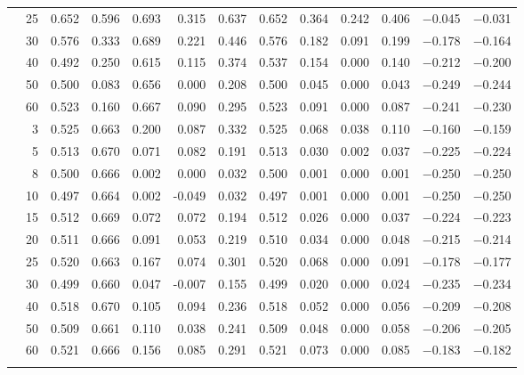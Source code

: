 \documentclass[conference]{IEEEtran}
\theoremstyle{remark}
\begin{document}
\begin{table}[ht]
{\begin{tabular}{p{2.2cm}r rrrr rr rr r rr}
  & 25 & 0.652 & 0.596 & 0.693 & 0.315 & 0.637 & 0.652 & 0.364 & 0.242 & 0.406 & $-$0.045 & $-$0.031 \\
  & 30 & 0.576 & 0.333 & 0.689 & 0.221 & 0.446 & 0.576 & 0.182 & 0.091 & 0.199 & $-$0.178 & $-$0.164 \\
  & 40 & 0.492 & 0.250 & 0.615 & 0.115 & 0.374 & 0.537 & 0.154 & 0.000 & 0.140 & $-$0.212 & $-$0.200 \\
  & 50 & 0.500 & 0.083 & 0.656 & 0.000 & 0.208 & 0.500 & 0.045 & 0.000 & 0.043 & $-$0.249 & $-$0.244 \\
  & 60 & 0.523 & 0.160 & 0.667 & 0.090 & 0.295 & 0.523 & 0.091 & 0.000 & 0.087 & $-$0.241 & $-$0.230 \\
\midrule
{}
  & 3  & 0.525 & 0.663 & 0.200 & 0.087 & 0.332 & 0.525 & 0.068 & 0.038 & 0.110 & $-$0.160 & $-$0.159 \\
  & 5  & 0.513 & 0.670 & 0.071 & 0.082 & 0.191 & 0.513 & 0.030 & 0.002 & 0.037 & $-$0.225 & $-$0.224 \\
  & 8  & 0.500 & 0.666 & 0.002 & 0.000 & 0.032 & 0.500 & 0.001 & 0.000 & 0.001 & $-$0.250 & $-$0.250 \\
  & 10 & 0.497 & 0.664 & 0.002 & -0.049 & 0.032 & 0.497 & 0.001 & 0.000 & 0.001 & $-$0.250 & $-$0.250 \\
  & 15 & 0.512 & 0.669 & 0.072 & 0.072 & 0.194 & 0.512 & 0.026 & 0.000 & 0.037 & $-$0.224 & $-$0.223 \\
  & 20 & 0.511 & 0.666 & 0.091 & 0.053 & 0.219 & 0.510 & 0.034 & 0.000 & 0.048 & $-$0.215 & $-$0.214 \\
  & 25 & 0.520 & 0.663 & 0.167 & 0.074 & 0.301 & 0.520 & 0.068 & 0.000 & 0.091 & $-$0.178 & $-$0.177 \\
  & 30 & 0.499 & 0.660 & 0.047 & -0.007 & 0.155 & 0.499 & 0.020 & 0.000 & 0.024 & $-$0.235 & $-$0.234 \\
  & 40 & 0.518 & 0.670 & 0.105 & 0.094 & 0.236 & 0.518 & 0.052 & 0.000 & 0.056 & $-$0.209 & $-$0.208 \\
  & 50 & 0.509 & 0.661 & 0.110 & 0.038 & 0.241 & 0.509 & 0.048 & 0.000 & 0.058 & $-$0.206 & $-$0.205 \\
  & 60 & 0.521 & 0.666 & 0.156 & 0.085 & 0.291 & 0.521 & 0.073 & 0.000 & 0.085 & $-$0.183 & $-$0.182 \\
\midrule
{}

\end{tabular}}
\end{table}
\end{document}
